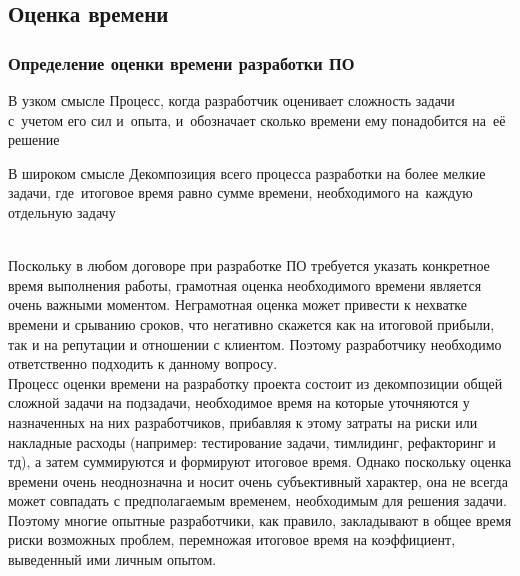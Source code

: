 \documentclass{../industrial-development}
\begin{document}
\subsection{Оценка времени}
\begin{frame} \frametitle{Определение оценки времени разработки ПО}
	\begin{minipage}{0.46\textwidth}
		\begin{block}{В узком смысле}
			Процесс, когда разработчик оценивает сложность задачи с~учетом его сил и~опыта, и~обозначает сколько времени ему понадобится на~её решение
		\end{block}
	\end{minipage}
	\hfill
	\begin{minipage}{0.47\textwidth}
		\begin{block}{В широком смысле}
			Декомпозиция всего процесса разработки на более мелкие задачи, где~итоговое время равно сумме времени, необходимого на~каждую отдельную задачу
		\end{block}{}
	\end{minipage}
\end{frame}
\lecturenotes
\\Поскольку в любом договоре при разработке ПО требуется указать конкретное время выполнения работы, грамотная оценка необходимого времени является очень важными моментом. Неграмотная оценка может привести к нехватке времени и срыванию сроков, что негативно скажется как на итоговой прибыли, так и на репутации и отношении с клиентом. Поэтому разработчику необходимо ответственно подходить к данному вопросу.\\ 
Процесс оценки времени на разработку проекта состоит из декомпозиции общей сложной задачи на подзадачи, необходимое время на которые уточняются у назначенных на них разработчиков, прибавляя к этому затраты на риски или накладные расходы (например: тестирование задачи, тимлидинг, рефакторинг и тд), а затем суммируются и формируют итоговое время. Однако поскольку оценка времени очень неоднозначна и носит очень субъективный характер, она не всегда может совпадать с предполагаемым временем, необходимым для решения задачи. Поэтому многие опытные разработчики, как правило, закладывают в общее время риски возможных проблем, перемножая итоговое время на коэффициент, выведенный ими личным опытом.
\end{document}
